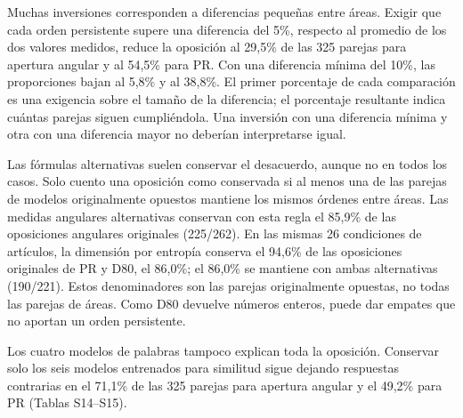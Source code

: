 \documentclass[12pt]{article}
\begin{document}
Muchas inversiones corresponden a diferencias pequeñas entre áreas. Exigir que cada orden persistente supere una diferencia del 5\%, respecto al promedio de los dos valores medidos, reduce la oposición al 29,5\% de las 325 parejas para apertura angular y al 54,5\% para PR. Con una diferencia mínima del 10\%, las proporciones bajan al 5,8\% y al 38,8\%. El primer porcentaje de cada comparación es una exigencia sobre el tamaño de la diferencia; el porcentaje resultante indica cuántas parejas siguen cumpliéndola. Una inversión con una diferencia mínima y otra con una diferencia mayor no deberían interpretarse igual.

Las fórmulas alternativas suelen conservar el desacuerdo, aunque no en todos los casos. Solo cuento una oposición como conservada si al menos una de las parejas de modelos originalmente opuestos mantiene los mismos órdenes entre áreas. Las medidas angulares alternativas conservan con esta regla el 85,9\% de las oposiciones angulares originales (225/262). En las mismas 26 condiciones de artículos, la dimensión por entropía conserva el 94,6\% de las oposiciones originales de PR y D80, el 86,0\%; el 86,0\% se mantiene con ambas alternativas (190/221). Estos denominadores son las parejas originalmente opuestas, no todas las parejas de áreas. Como D80 devuelve números enteros, puede dar empates que no aportan un orden persistente.

Los cuatro modelos de palabras tampoco explican toda la oposición. Conservar solo los seis modelos entrenados para similitud sigue dejando respuestas contrarias en el 71,1\% de las 325 parejas para apertura angular y el 49,2\% para PR (Tablas S14--S15).
\end{document}
